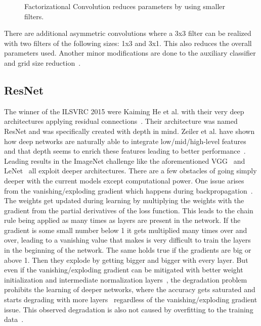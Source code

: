 \begin{figure}[!h]
\centering
\caption{Factorizational Convolution reduces parameters by using smaller filters.}
\label{fig:factorization}
\end{figure}

\newpage

There are additional asymmetric convolutions where a 3x3 filter can be realized with two filters of the following sizes: 1x3 and 3x1. This also reduces the overall parameters used. Another minor modifications are done to the auxiliary classifier and grid size reduction~\cite{szegedy2016rethinking}.\\



\subsection{ResNet}

The winner of the ILSVRC 2015 were Kaiming He et al. with their very deep architectures applying residual connections~\cite{he2016deep, he2016identity}. Their architecture was named ResNet and was specifically created with depth in mind. Zeiler et al. have shown how deep networks are naturally able to integrate low/mid/high-level features and that depth seems to enrich these features leading to better performance~\cite{zeiler2014visualizing}. Leading results in the ImageNet challenge like the aforementioned VGG~\cite{simonyan2014very} and LeNet~\cite{szegedy2015going} all exploit deeper architectures. There are a few obstacles of going simply deeper with the current models except computational power. One issue arises from the vanishing/exploding gradient which happens during backpropagation~\cite{glorot2010understanding}. The weights get updated during learning by multiplying the weights with the gradient from the partial derivatives of the loss function. This leads to the chain rule being applied as many times as layers are present in the network. If the gradient is some small number below 1 it gets multiplied many times over and over, leading to a vanishing value that makes is very difficult to train the layers in the beginning of the network. The same holds true if the gradients are big or above 1. Then they explode by getting bigger and bigger with every layer. But even if the vanishing/exploding gradient can be mitigated with better weight initialization and intermediate normalization layers~\cite{ioffe2015batch}, the degradation problem prohibits the learning of deeper networks, where the accuracy gets saturated and starts degrading with more layers~\cite{he2016deep} regardless of the vanishing/exploding gradient issue. This observed degradation is also not caused by overfitting to the training data~\cite{he2015convolutional, srivastava2015highway}.\\

